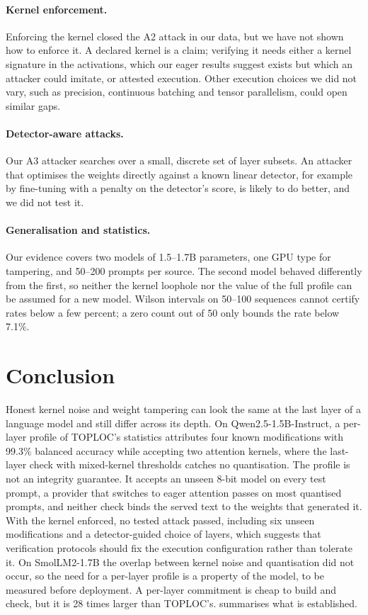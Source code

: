 \documentclass[10pt,twocolumn]{article}
\begin{document}
\paragraph{Kernel enforcement.}
Enforcing the kernel closed the A2 attack in our data, but we have not shown how to enforce it.
A declared kernel is a claim; verifying it needs either a kernel signature in the activations, which our eager results suggest exists but which an attacker could imitate, or attested execution.
Other execution choices we did not vary, such as precision, continuous batching and tensor parallelism, could open similar gaps.

\paragraph{Detector-aware attacks.}
Our A3 attacker searches over a small, discrete set of layer subsets.
An attacker that optimises the weights directly against a known linear detector, for example by fine-tuning with a penalty on the detector's score, is likely to do better, and we did not test it.

\paragraph{Generalisation and statistics.}
Our evidence covers two models of 1.5--1.7B parameters, one GPU type for tampering, and 50--200 prompts per source.
The second model behaved differently from the first, so neither the kernel loophole nor the value of the full profile can be assumed for a new model.
Wilson intervals on 50--100 sequences cannot certify rates below a few percent; a zero count out of 50 only bounds the rate below 7.1\%.

\section{Conclusion}
\label{sec:conclusion}

Honest kernel noise and weight tampering can look the same at the last layer of a language model and still differ across its depth.
On Qwen2.5-1.5B-Instruct, a per-layer profile of TOPLOC's statistics attributes four known modifications with 99.3\% balanced accuracy while accepting two attention kernels, where the last-layer check with mixed-kernel thresholds catches no quantisation.
The profile is not an integrity guarantee.
It accepts an unseen 8-bit model on every test prompt, a provider that switches to eager attention passes on most quantised prompts, and neither check binds the served text to the weights that generated it.
With the kernel enforced, no tested attack passed, including six unseen modifications and a detector-guided choice of layers, which suggests that verification protocols should fix the execution configuration rather than tolerate it.
On SmolLM2-1.7B the overlap between kernel noise and quantisation did not occur, so the need for a per-layer profile is a property of the model, to be measured before deployment.
A per-layer commitment is cheap to build and check, but it is 28 times larger than TOPLOC's.
 summarises what is established.
\end{document}
